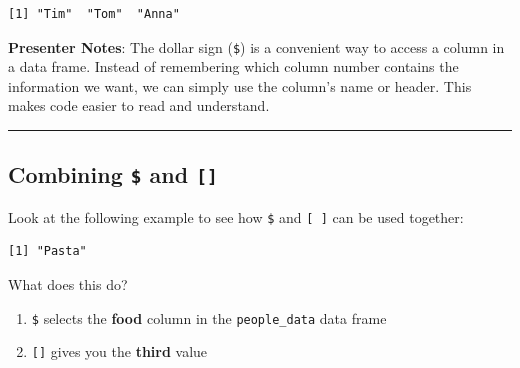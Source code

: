 \documentclass[
  letterpaper,
  DIV=11,
  numbers=noendperiod]{scrartcl}
\newenvironment{Shaded}{\begin{snugshade}}{\end{snugshade}}
\newcommand{\CommentTok}[1]{\textcolor[rgb]{0.37,0.37,0.37}{#1}}
\newcommand{\DecValTok}[1]{\textcolor[rgb]{0.68,0.00,0.00}{#1}}
\newcommand{\NormalTok}[1]{\textcolor[rgb]{0.00,0.23,0.31}{#1}}
\newcommand{\SpecialCharTok}[1]{\textcolor[rgb]{0.37,0.37,0.37}{#1}}
\providecommand{\tightlist}{%
  \setlength{\itemsep}{0pt}\setlength{\parskip}{0pt}}
\begin{document}
\begin{Shaded}
\end{Shaded}

\begin{verbatim}
[1] "Tim"  "Tom"  "Anna"
\end{verbatim}

\textbf{Presenter Notes}: The dollar sign (\texttt{\$}) is a convenient
way to access a column in a data frame. Instead of remembering which
column number contains the information we want, we can simply use the
column's name or header. This makes code easier to read and understand.

\begin{center}\rule{0.5\linewidth}{0.5pt}\end{center}

\subsection{\texorpdfstring{Combining \texttt{\$} and
\texttt{{[}{]}}}{Combining \$ and {[}{]}}}\label{combining-and}

Look at the following example to see how \texttt{\$} and
\texttt{{[}\ {]}} can be used together:

\begin{Shaded}
\end{Shaded}

\begin{verbatim}
[1] "Pasta"
\end{verbatim}

What does this do?

\begin{enumerate}
\def\labelenumi{\arabic{enumi}.}
\tightlist
\item
  \texttt{\$} selects the \textbf{food} column in the
  \texttt{people\_data} data frame
\item
  \texttt{{[}{]}} gives you the \textbf{third} value
\end{enumerate}
\end{document}
